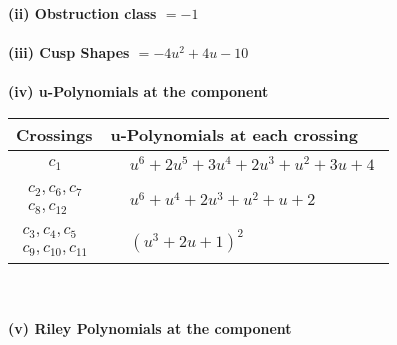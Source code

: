 \documentclass[1p]{elsarticle_modified}
\theoremstyle{definition}
\begin{document}
\flushleft \textbf{(ii) Obstruction class $= -1$}\\~\\
\flushleft \textbf{(iii) Cusp Shapes $= -4 u^2+4 u-10$}\\~\\
\newpage\renewcommand{\arraystretch}{1}
\flushleft \textbf{(iv) u-Polynomials at the component}\newline \\
\begin{tabular}{m{50pt}|m{274pt}}
Crossings & \hspace{64pt}u-Polynomials at each crossing \\
\hline $$\begin{aligned}c_{1}\end{aligned}$$&$\begin{aligned}
&u^6+2 u^5+3 u^4+2 u^3+u^2+3 u+4
\end{aligned}$\\
\hline $$\begin{aligned}c_{2},c_{6},c_{7}\\c_{8},c_{12}\end{aligned}$$&$\begin{aligned}
&u^6+u^4+2 u^3+u^2+u+2
\end{aligned}$\\
\hline $$\begin{aligned}c_{3},c_{4},c_{5}\\c_{9},c_{10},c_{11}\end{aligned}$$&$\begin{aligned}
&(u^3+2 u+1)^2
\end{aligned}$\\
\hline
\end{tabular}\\~\\
\newpage\renewcommand{\arraystretch}{1}
\flushleft \textbf{(v) Riley Polynomials at the component}\newline \\
\end{document}
